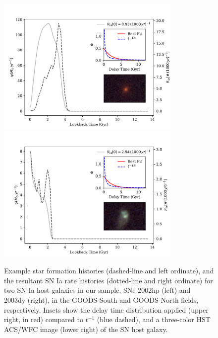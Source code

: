 \documentclass[apj]{aastex62}
\begin{document}
\begin{figure}[t] %
   \includegraphics[width=3.5in]{figure_sfh_demo_v1} 
   \includegraphics[width=3.5in]{figure_sfh_demo_v2} 
   \caption{\footnotesize Example star formation histories (dashed-line and left ordinate), and the resultant SN Ia rate histories (dotted-line and right ordinate) for two SN Ia host galaxies in our sample, SNe 2002hp (left) and 2003dy (right), in the GOODS-South and GOODS-North fields, respectively. Insets show the delay time distribution applied (upper right, in red) compared to $t^{-1}$ (blue dashed), and a three-color HST ACS/WFC image (lower right) of the SN host galaxy.}
   \label{fig:figure_sfh_fit_demo}
\end{figure}
\end{document}
